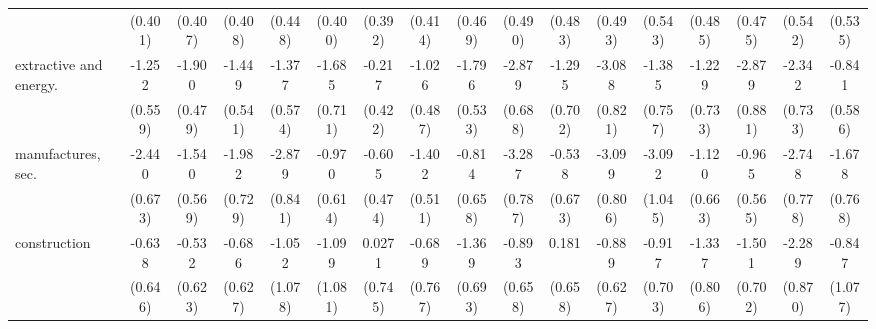 {\begin{tabular}{l*{16}{c}}
                    &     (0.401)         &     (0.407)         &     (0.408)         &     (0.448)         &     (0.400)         &     (0.392)         &     (0.414)         &     (0.469)         &     (0.490)         &     (0.483)         &     (0.493)         &     (0.543)         &     (0.485)         &     (0.475)         &     (0.542)         &     (0.535)         \\
[1em]
extractive and energy.&      -1.252\sym{*}  &      -1.900\sym{***}&      -1.449\sym{**} &      -1.377\sym{*}  &      -1.685\sym{*}  &      -0.217         &      -1.026\sym{*}  &      -1.796\sym{***}&      -2.879\sym{***}&      -1.295         &      -3.088\sym{***}&      -1.385         &      -1.229         &      -2.879\sym{**} &      -2.342\sym{**} &      -0.841         \\
                    &     (0.559)         &     (0.479)         &     (0.541)         &     (0.574)         &     (0.711)         &     (0.422)         &     (0.487)         &     (0.533)         &     (0.688)         &     (0.702)         &     (0.821)         &     (0.757)         &     (0.733)         &     (0.881)         &     (0.733)         &     (0.586)         \\
[1em]
manufactures, sec.  &      -2.440\sym{***}&      -1.540\sym{**} &      -1.982\sym{**} &      -2.879\sym{***}&      -0.970         &      -0.605         &      -1.402\sym{**} &      -0.814         &      -3.287\sym{***}&      -0.538         &      -3.099\sym{***}&      -3.092\sym{**} &      -1.120         &      -0.965         &      -2.748\sym{***}&      -1.678\sym{*}  \\
                    &     (0.673)         &     (0.569)         &     (0.729)         &     (0.841)         &     (0.614)         &     (0.474)         &     (0.511)         &     (0.658)         &     (0.787)         &     (0.673)         &     (0.806)         &     (1.045)         &     (0.663)         &     (0.565)         &     (0.778)         &     (0.768)         \\
[1em]
construction        &      -0.638         &      -0.532         &      -0.686         &      -1.052         &      -1.099         &      0.0271         &      -0.689         &      -1.369\sym{*}  &      -0.893         &       0.181         &      -0.889         &      -0.917         &      -1.337         &      -1.501\sym{*}  &      -2.289\sym{**} &      -0.847         \\
                    &     (0.646)         &     (0.623)         &     (0.627)         &     (1.078)         &     (1.081)         &     (0.745)         &     (0.767)         &     (0.693)         &     (0.658)         &     (0.658)         &     (0.627)         &     (0.703)         &     (0.806)         &     (0.702)         &     (0.870)         &     (1.077)         \\

\end{tabular}}
